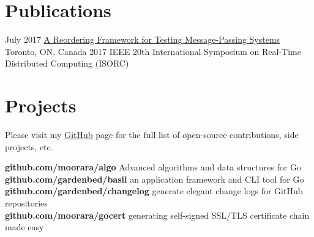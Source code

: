 \documentclass[]{cv-style}                     %
\begin{document}
\section{Publications}

\begin{entrylist}

  \entry
  {\small July 2017}
  {\href{http://ieeexplore.ieee.org/abstract/document/7964877}{A Reordering Framework for Testing Message-Passing Systems}}
  {Toronto, ON, Canada}
  {\small{2017 IEEE 20th International Symposium on Real-Time Distributed Computing (ISORC)}}

\end{entrylist}



\section{Projects}

Please visit my \href{http://github.com/moorara}{GitHub} page for the full list of open-source contributions, side projects, etc.

\textbf{github.com/moorara/algo} Advanced algorithms and data structures for Go \\
\textbf{github.com/gardenbed/basil} an application framework and CLI tool for Go  \\
\textbf{github.com/gardenbed/changelog} generate elegant change logs for GitHub repositories  \\
\textbf{github.com/moorara/gocert} generating self-signed SSL/TLS certificate chain made easy \\

\begin{entrylist}



\end{entrylist}
\end{document}
